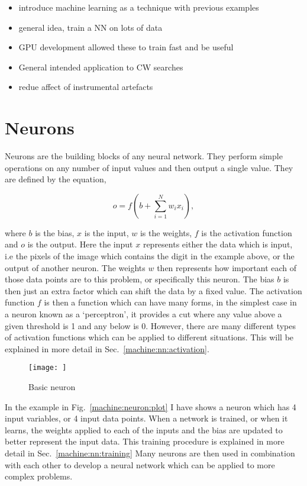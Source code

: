 \begin{itemize}
    \item introduce machine learning as a technique with previous examples
    \item general idea, train a NN on lots of data
    \item GPU development allowed these to train fast and be useful
    \item General intended application to CW searches
    \item redue affect of instrumental artefacts
\end{itemize}

\section{\label{machine:nn:neuron}Neurons}
Neurons are the building blocks of any neural network.
They perform simple operations on any number of input values and then output a single value.
They are defined by the equation,

\begin{equation}
    o = f\left(b + \sum_{i=1}^{N} w_i x_i  \right),
    \label{machine:nn:neuron:equation}
\end{equation}

where $b$ is the bias, $x$ is the input, $w$ is the weights, $f$ is the activation function and $o$ is the output.
Here the input $x$ represents either the data which is input, i.e the pixels of the image which contains the digit in the example above, or the output of another neuron.
The weights $w$ then represents how important each of those data points are to this problem, or specifically this neuron. 
The bias $b$ is then just an extra factor which can shift the data by a fixed value.
The activation function $f$ is then a function which can have many forms, in the simplest case in a neuron known as a `perceptron', it provides a cut where any value above a given threshold is 1 and any below is 0. 
However, there are many different types of activation functions which can be applied to different situations.
This will be explained in more detail in Sec.~\ref{machine:nn:activation}.

\begin{figure}[h]
    \centering
    \texttt{[image: ]}
    \caption{Basic neuron}
    \label{machine:nn:neuron:plot}
\end{figure}

In the example in Fig.~\ref{machine:neuron:plot} I have shows a neuron which has 4 input variables, or 4 input data points. 
When a network is trained, or when it learns, the weights applied to each of the inputs and the bias are updated to better represent the input data.
This training procedure is explained in more detail in Sec.~\ref{machine:nn:training}
Many neurons are then used in combination with each other to develop a neural network which can be applied to more complex problems.

